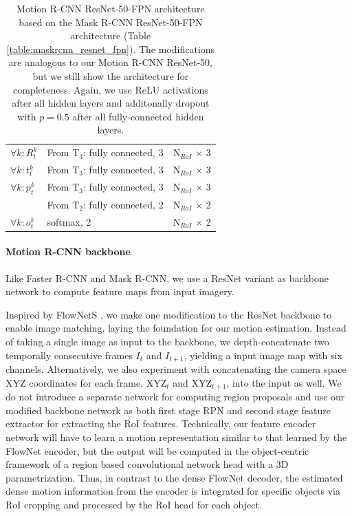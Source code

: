 {\begin{table}[h]
\begin{tabular}{llr}
$\forall k: R_t^k$ & From T$_3$: fully connected, 3 & N$_{RoI}$ $\times$ 3 \\
$\forall k: t_t^k$ & From T$_3$: fully connected, 3 & N$_{RoI}$ $\times$ 3 \\
$\forall k: p_t^k$ & From T$_3$: fully connected, 3 & N$_{RoI}$ $\times$ 3 \\
& From T$_2$: fully connected, 2 & N$_{RoI}$ $\times$ 2 \\
$\forall k: o_t^k$ & softmax, 2 & N$_{RoI}$ $\times$ 2 \\

\bottomrule
\end{tabular}

\caption {
Motion R-CNN ResNet-50-FPN architecture based on the Mask R-CNN
ResNet-50-FPN architecture (Table \ref{table:maskrcnn_resnet_fpn}).
The modifications are analogous to our Motion R-CNN ResNet-50,
but we still show the architecture for completeness.
Again, we use ReLU activations after all hidden layers and
additonally dropout with $p = 0.5$ after all fully-connected hidden layers.
}
\label{table:motionrcnn_resnet_fpn}
\end{table}
}

\paragraph{Motion R-CNN backbone}
Like Faster R-CNN and Mask R-CNN, we use a ResNet \cite{ResNet} variant as backbone network to compute feature maps from input imagery.

Inspired by FlowNetS \cite{FlowNet}, we make one modification to the ResNet backbone to enable image matching,
laying the foundation for our motion estimation. Instead of taking a single image as input to the backbone,
we depth-concatenate two temporally consecutive frames $I_t$ and $I_{t+1}$, yielding a input image map with six channels.
Alternatively, we also experiment with concatenating the camera space XYZ coordinates for each frame,
XYZ$_t$ and XYZ$_{t+1}$, into the input as well.
We do not introduce a separate network for computing region proposals and use our modified backbone network
as both first stage RPN and second stage feature extractor for extracting the RoI features.
Technically, our feature encoder network will have to learn a motion representation similar to
that learned by the FlowNet encoder, but the output will be computed in the
object-centric framework of a region based convolutional network head with a 3D parametrization.
Thus, in contrast to the dense FlowNet decoder, the estimated dense motion information
from the encoder is integrated for specific objects via RoI cropping and
processed by the RoI head for each object.

